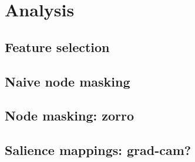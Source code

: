 

\section{Analysis}
\subsection{Feature selection}
\subsection{Naive node masking}
\subsection{Node masking: zorro}
\subsection{Salience mappings: grad-cam?}